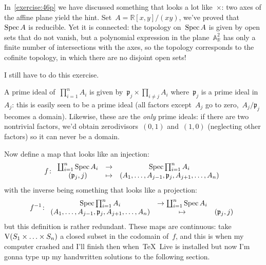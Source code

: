 \begin{exercise}
  In~\autoref{exercise:46p} we have discussed something that looks a lot like~$\times$: two axes of the affine plane yield the hint. Set~$A=\mathbb{R}[x,y]/(xy)$, we've proved that~$\operatorname{Spec} A$ is reducible. Yet it is connected: the topology on~$\operatorname{Spec} A$ is given by open sets that do not vanish, but a polynomial expression in the plane~$\mathbb{A}_{\mathbb{R}}^2$ has only a finite number of intersections with the axes, so the topology corresponds to the cofinite topology, in which there are no disjoint open sets!
\end{exercise}

\begin{exercise} %
  I still have to do this exercise.
\end{exercise}

\begin{exercise} %
  A prime ideal of~$\prod_{i=1}^nA_i$ is given by~$\mathfrak{p}_j\times\prod_{i\neq j}A_i$ where~$\mathfrak{p}_j$ is a prime ideal in~$A_j$: this is easily seen to be a prime ideal (all factors except~$A_j$ go to zero,~$A_j/\mathfrak{p}_j$ becomes a domain). Likewise, these are the \emph{only} prime ideals: if there are two nontrivial factors, we'd obtain zerodivisors~$(0,1)$ and~$(1,0)$ (neglecting other factors) so it can never be a domain.

  Now define a map that looks like an injection:
  \begin{equation}
    f\colon
    \begin{array}{ccc}
      \coprod_{i=1}^n\operatorname{Spec} A_i&\to&\operatorname{Spec}\prod_{i=1}^nA_i \\
      (\mathfrak{p}_j,j)&\mapsto&(A_1,\ldots,A_{j-1},\mathfrak{p}_j,A_{j+1},\ldots,A_n)
    \end{array}
  \end{equation}
  with the inverse being something that looks like a projection:
  \begin{equation}
    f^{-1}\colon
    \begin{array}{ccc}
      \operatorname{Spec}\prod_{i=1}^nA_i&\to\coprod_{i=1}^n\operatorname{Spec} A_i \\
      (A_1,\ldots,A_{j-1},\mathfrak{p}_j,A_{j+1},\ldots,A_n)&\mapsto&(\mathfrak{p}_j,j)
    \end{array}
  \end{equation}
  but this definition is rather redundant. These maps are continuous: take~$\operatorname{V}(S_1\times\ldots\times S_n)$ a closed subset in the codomain of~$f$, and this is when my computer crashed and I'll finish then when~\TeX\ Live is installed but now I'm gonna type up my handwritten solutions to the following section.
\end{exercise}



